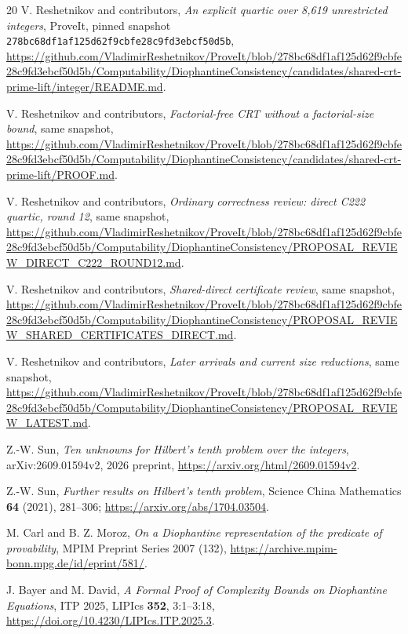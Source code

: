 \documentclass[11pt,letterpaper]{article}
\theoremstyle{definition}
\begin{document}
\begin{thebibliography}{20}
V. Reshetnikov and contributors, \emph{An explicit quartic over 8,619
unrestricted integers}, ProveIt, pinned snapshot
\texttt{278bc68df1af125d62f9cbfe28c9fd3ebcf50d5b},
\url{https://github.com/VladimirReshetnikov/ProveIt/blob/278bc68df1af125d62f9cbfe28c9fd3ebcf50d5b/Computability/DiophantineConsistency/candidates/shared-crt-prime-lift/integer/README.md}.

V. Reshetnikov and contributors, \emph{Factorial-free CRT without a
factorial-size bound}, same snapshot,
\url{https://github.com/VladimirReshetnikov/ProveIt/blob/278bc68df1af125d62f9cbfe28c9fd3ebcf50d5b/Computability/DiophantineConsistency/candidates/shared-crt-prime-lift/PROOF.md}.

V. Reshetnikov and contributors, \emph{Ordinary correctness review:
direct C222 quartic, round 12}, same snapshot,
\url{https://github.com/VladimirReshetnikov/ProveIt/blob/278bc68df1af125d62f9cbfe28c9fd3ebcf50d5b/Computability/DiophantineConsistency/PROPOSAL_REVIEW_DIRECT_C222_ROUND12.md}.

V. Reshetnikov and contributors, \emph{Shared-direct certificate
review}, same snapshot,
\url{https://github.com/VladimirReshetnikov/ProveIt/blob/278bc68df1af125d62f9cbfe28c9fd3ebcf50d5b/Computability/DiophantineConsistency/PROPOSAL_REVIEW_SHARED_CERTIFICATES_DIRECT.md}.

V. Reshetnikov and contributors, \emph{Later arrivals and current size
reductions}, same snapshot,
\url{https://github.com/VladimirReshetnikov/ProveIt/blob/278bc68df1af125d62f9cbfe28c9fd3ebcf50d5b/Computability/DiophantineConsistency/PROPOSAL_REVIEW_LATEST.md}.

Z.-W. Sun, \emph{Ten unknowns for Hilbert's tenth problem over the
integers}, arXiv:2609.01594v2, 2026 preprint,
\url{https://arxiv.org/html/2609.01594v2}.

Z.-W. Sun, \emph{Further results on Hilbert's tenth problem},
Science China Mathematics \textbf{64} (2021), 281--306;
\url{https://arxiv.org/abs/1704.03504}.

M. Carl and B. Z. Moroz, \emph{On a Diophantine representation of the
predicate of provability}, MPIM Preprint Series 2007 (132),
\url{https://archive.mpim-bonn.mpg.de/id/eprint/581/}.

J. Bayer and M. David, \emph{A Formal Proof of Complexity Bounds on
Diophantine Equations}, ITP 2025, LIPIcs \textbf{352}, 3:1--3:18,
\url{https://doi.org/10.4230/LIPIcs.ITP.2025.3}.
\end{thebibliography}
\end{document}
